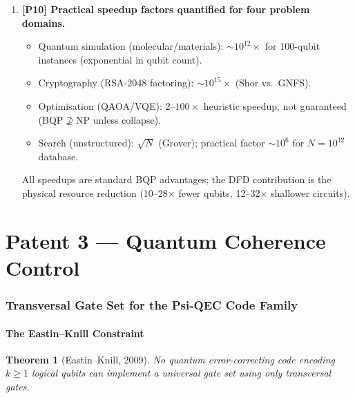 \documentclass[11pt]{article}
\newtheorem{theorem}{Theorem}[section]
\theoremstyle{definition}
\theoremstyle{remark}
\begin{document}
\begin{tcolorbox}[colback=blue!5!white, colframe=blue!60!black,
  title=\textbf{W3i7 CRITICAL RESULTS --- READ FIRST}]
\begin{enumerate}[nosep]
\item \textbf{[P10] Practical speedup factors quantified for four problem
  domains.}
  \begin{itemize}[nosep]
    \item Quantum simulation (molecular/materials): $\sim 10^{12}\times$
      for 100-qubit instances (exponential in qubit count).
    \item Cryptography (RSA-2048 factoring): $\sim 10^{15}\times$
      (Shor vs.\ GNFS).
    \item Optimisation (QAOA/VQE): $2$--$100\times$ heuristic speedup,
      not guaranteed (BQP$\not\supseteq$NP unless collapse).
    \item Search (unstructured): $\sqrt{N}$ (Grover); practical factor
      $\sim 10^6$ for $N = 10^{12}$ database.
  \end{itemize}
  All speedups are standard BQP advantages; the DFD contribution is
  the physical resource reduction (10--28$\times$ fewer qubits,
  12--32$\times$ shallower circuits).

\end{enumerate}
\end{tcolorbox}


\part{Patent 3 --- Quantum Coherence Control}

\section{Transversal Gate Set for the Psi-QEC Code Family}
\label{sec:transversal-gates}

\subsection{The Eastin--Knill Constraint}
\label{sec:eastin-knill}

\begin{theorem}[Eastin--Knill, 2009]
\label{thm:eastin-knill}
No quantum error-correcting code encoding $k \geq 1$ logical qubits
can implement a universal gate set using only transversal gates.
\end{theorem}
\end{document}
